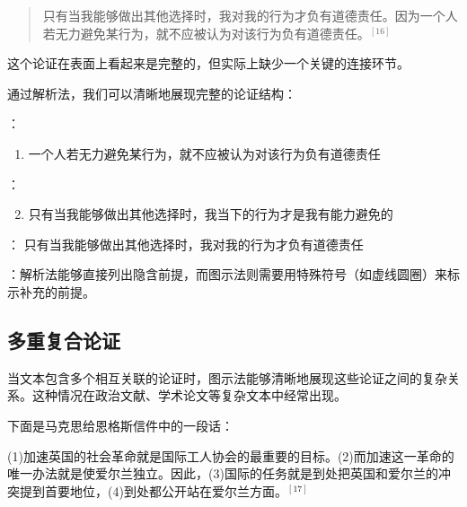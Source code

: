 \begin{examplebox}[title=处理隐含前提的例子]
\begin{quotation}
只有当我能够做出其他选择时，我对我的行为才负有道德责任。因为一个人若无力避免某行为，就不应被认为对该行为负有道德责任。${}^{[16]}$
\end{quotation}

这个论证在表面上看起来是完整的，但实际上缺少一个关键的连接环节。
\end{examplebox}

\begin{theorembox}[title=解析法揭示隐含前提]
通过解析法，我们可以清晰地展现完整的论证结构：

：
\begin{enumerate}
  \item 一个人若无力避免某行为，就不应被认为对该行为负有道德责任
\end{enumerate}

：
\begin{enumerate}
  \setcounter{enumi}{1}
  \item 只有当我能够做出其他选择时，我当下的行为才是我有能力避免的
\end{enumerate}

：
只有当我能够做出其他选择时，我对我的行为才负有道德责任

：解析法能够直接列出隐含前提，而图示法则需要用特殊符号（如虚线圆圈）来标示补充的前提。
\end{theorembox}

\subsection{多重复合论证}

当文本包含多个相互关联的论证时，图示法能够清晰地展现这些论证之间的复杂关系。这种情况在政治文献、学术论文等复杂文本中经常出现。

\begin{examplebox}[title=多重论证的实例]
下面是马克思给恩格斯信件中的一段话：
\begin{displayquote}
(1)加速英国的社会革命就是国际工人协会的最重要的目标。(2)而加速这一革命的唯一办法就是使爱尔兰独立。因此，(3)国际的任务就是到处把英国和爱尔兰的冲突提到首要地位，(4)到处都公开站在爱尔兰方面。${}^{[17]}$
\end{displayquote}
\end{examplebox}


